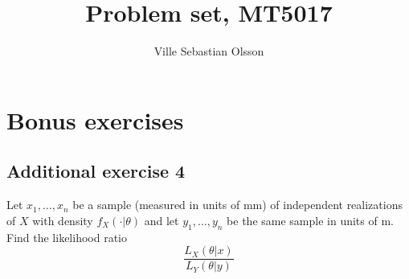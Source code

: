 \documentclass{article}
\title{Problem set, MT5017}
\author{Ville Sebastian Olsson}
\begin{document}
\maketitle
\tableofcontents

\section{Bonus exercises}
\subsection{Additional exercise 4}

\begin{sproblem}
Let \(x_1,\ldots,x_n\) be a sample (measured in units of mm) of independent
realizations of \(X\) with density \(f_X(\cdot |\theta)\) and let \(y_1, \ldots , y_n\) be the same sample in units of m. Find the likelihood ratio
\[\frac{L_X(\theta|x)}{L_Y(\theta|y)}\]
\end{sproblem}
\end{document}
